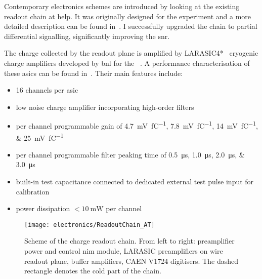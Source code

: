 
Contemporary electronics schemes are introduced by looking at the existing readout chain at \gls{help}.
It was originally designed for the \AT{} experiment and a more detailed description can be found in~\cite{AT_larasic}.
I successfully upgraded the chain to partial differential signalling, significantly improving the \gls{snr}.

The charge collected by the readout plane is amplified by LARASIC4*~\cite{larasic} cryogenic charge amplifiers developed by \gls{bnl} for the \uboone{}~\cite{uboone}.
A performance characterisation of these \glspl{asic} can be found in~\cite{AT_larasic}.
Their main features include:

\begin{itemize}
	\item \num{16} channels per \gls{asic}
	\item low noise charge amplifier incorporating high-order filters
	\item per channel programmable gain of \SIlist[list-final-separator = {, or }]{4.7; 7.8; 14; 25}{\milli\volt\per\femto\coulomb}
	\item per channel programmable filter peaking time of \SIlist[list-final-separator = {, or }]{0.5; 1.0; 2.0; 3.0}{\micro\second}
	\item built-in test capacitance connected to dedicated external test pulse input for calibration
	\item power dissipation $< \SI{10}{\milli\watt}$ per channel
\end{itemize}

\begin{figure}[htb]
	\centering
	\texttt{[image: electronics/ReadoutChain\_AT]}
	\caption[\AT{} charge readout chain]{%
		Scheme of the \AT{} charge readout chain.
		From left to right: preamplifier power and control \acrshort{nim} module, LARASIC preamplifiers on wire readout plane, buffer amplifiers, CAEN V1724 digitisers.
		The dashed rectangle denotes the cold part of the chain.~\cite{AT_larasic}
	}
	\label{fig:viper_readoutChain_AT}
\end{figure}

